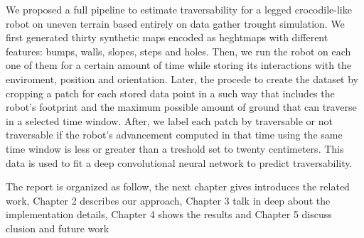 \documentclass[../document.tex]{subfiles}
\begin{document}
We proposed a full pipeline to estimate traversability for a legged crocodile-like robot on uneven terrain based entirely on data gather trought simulation. We first generated thirty synthetic maps encoded as heghtmaps with different features: bumps, walls, slopes, steps and holes. Then, we run the robot on each one of them for a certain amount of time while storing its interactions with the enviroment, position and orientation. Later, the procede to create the dataset by cropping a patch for each stored data point in a such way that includes the robot's footprint and the maximum possible amount of ground that can traverse in a selected time window. After, we label each patch by traversable or not traversable if the robot's advancement computed in that time using the same time window is less or greater than a treshold set to twenty centimeters. This data is used to fit a deep convolutional neural network to predict traversability. 

The report is organized as follow, the next chapter  gives introduces the related work, Chapter 2 describes our approach, Chapter 3 talk in deep about the implementation details,
Chapter 4 shows the results and Chapter 5 discuss clusion and future work
\end{document}

